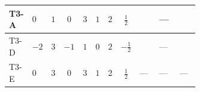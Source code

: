 \documentclass[8pt]{article}
\begin{document}
\begin{landscape}
\begin{longtable}{@{}llcccccc >{\raggedright\arraybackslash}p{0.21\linewidth} >{\raggedright\arraybackslash}p{0.21\linewidth} >{\raggedright\arraybackslash}p{0.21\linewidth}@{}}
\midrule
T3-A & $0$ & $1$ & $0$ & $3$ & $1$ & $2$ & $\frac{1}{2}$ & \scriptsize\adjustbox{max width=\linewidth}{$\begin{gathered} -12 {g_2}^2 {\lambda_{12}}\end{gathered}$} & --- & \scriptsize\adjustbox{max width=\linewidth}{$\begin{gathered} -6 {g_Y}^2 {\lambda_{12}}\end{gathered}$} \\
\midrule
T3-D & $-2$ & $3$ & $-1$ & $1$ & $0$ & $2$ & $-\frac{1}{2}$ & \scriptsize\adjustbox{max width=\linewidth}{$\begin{gathered} -12 {g_2}^2 {\lambda_{12}}\end{gathered}$} & --- & \scriptsize\adjustbox{max width=\linewidth}{$\begin{gathered} -6 {g_Y}^2 {\lambda_{12}}\end{gathered}$} \\
\midrule
T3-E & $0$ & $3$ & $0$ & $3$ & $1$ & $2$ & $\frac{1}{2}$ & --- & --- & --- \\
\midrule
\bottomrule
\end{longtable}
\clearpage

\end{landscape}
\end{document}
